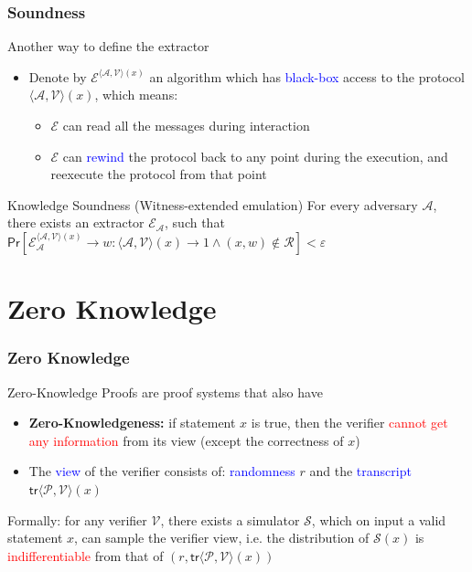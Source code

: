 \documentclass{beamer}
\newcommand{\blue}[1]{\textcolor{blue}{#1}}
\newcommand{\dgreen}[1]{\textcolor{dgreen}{#1}}
\newcommand{\red}[1]{\textcolor{red}{#1}}
\begin{document}
\frame
{
  \frametitle{Soundness}
  \onslide<+-> Another way to define the extractor
  \begin{itemize}
    \item<+->Denote by $\mathcal{E}^{\langle\mathcal{A},\mathcal{V}\rangle(x)}$ an algorithm which has \blue{black-box} access to the protocol $\langle\mathcal{A},\mathcal{V}\rangle(x)$, which means:
    \begin{itemize}
      \item $\mathcal{E}$ can read all the messages during interaction
      \item $\mathcal{E}$ can \blue{rewind} the protocol back to any point during the execution, and reexecute the protocol from that point
    \end{itemize}
  \end{itemize}
  \onslide<+->\begin{block}{Knowledge Soundness (Witness-extended emulation)}
  For every adversary $\mathcal{A}$, there exists an extractor $\mathcal{E}_{\mathcal{A}}$, such that $\mathsf{Pr}[\mathcal{E}_{\mathcal{A}}^{\langle\mathcal{A},\mathcal{V}\rangle(x)}\to w:\langle\mathcal{A},\mathcal{V}\rangle(x)\to 1 \wedge (x,w)\notin\mathcal{R}]<\varepsilon$
  \end{block}
}

\section{Zero Knowledge}
\frame
{
  \frametitle{Zero Knowledge}
  \onslide<+-> Zero-Knowledge Proofs are proof systems that also have
  \begin{itemize}
    \item<+-> \textbf{Zero-Knowledgeness:} if \dgreen{statement $x$ is true}, then the verifier \red{cannot get any information} from its view (except the correctness of $x$)
    \item<+-> The \blue{view} of the verifier consists of: \blue{randomness} $r$ and the \blue{transcript} $\mathsf{tr}\langle\mathcal{P},\mathcal{V}\rangle(x)$
  \end{itemize}
  \onslide<+-> Formally: for any verifier $\mathcal{V}$, there exists a simulator $\mathcal{S}$, which on input a \dgreen{valid statement $x$}, can sample the verifier view, i.e. the distribution of $\mathcal{S}(x)$ is \red{indifferentiable} from that of $(r,\mathsf{tr}\langle\mathcal{P},\mathcal{V}\rangle(x))$
}
\end{document}
